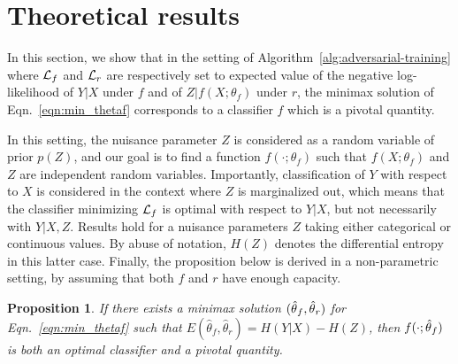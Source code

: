\documentclass{article}
\theoremstyle{plain}
\newtheorem{proposition}[theorem]{Proposition}
\begin{document}

\section{Theoretical results}
\label{sec:theory}

In this section, we show that in the setting of
Algorithm~\ref{alg:adversarial-training} where ${\cal L}_f$ and ${\cal L}_r$ are
respectively set to expected value of the negative log-likelihood of $Y|X$ under
$f$ and of $Z|f(X;\theta_f)$ under $r$, the minimax solution of Eqn.~\ref{eqn:min_thetaf}
corresponds to a classifier
$f$ which is a pivotal quantity.

In this setting, the nuisance parameter $Z$ is considered as a random variable
of prior $p(Z)$, and our goal is to find a function
$f(\cdot;\theta_f)$ such that $f(X;\theta_f)$ and $Z$ are independent random
variables.   Importantly, classification of $Y$ with respect to $X$ is
considered in the context where $Z$ is marginalized out, which means that the
classifier minimizing ${\cal L}_f$ is optimal with respect to $Y|X$, but not
necessarily with $Y|X,Z$.
Results hold for a nuisance parameters $Z$ taking either
categorical or continuous values. By abuse of notation, $H(Z)$ denotes the
differential entropy in this latter case. Finally, the  proposition below is
derived in a non-parametric setting, by assuming that both $f$ and $r$ have
enough capacity.

\begin{proposition}\label{prop:2}
If there exists a minimax solution $(\smash{\hat\theta}_f, \smash{\hat\theta}_r)$
for Eqn.~\ref{eqn:min_thetaf} such that
$E(\hat\theta_f, \hat\theta_r) = H({Y|X}) - H(Z)$, then
$f(\cdot;\smash{\hat\theta}_f)$ is both an optimal classifier and a pivotal
quantity.
\end{proposition}
\end{document}
